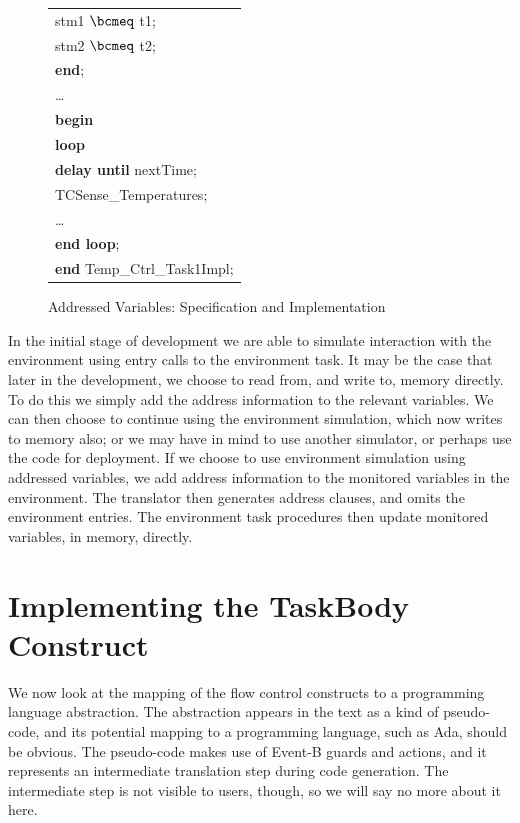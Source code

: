 \begin{figure}[b]
\begin{sffamily}
\begin{minipage}{0.5\linewidth}
\begin{center}
\begin{tabular}{l}
\qquad    stm1 $\bcmeq$ t1; \\
\qquad    stm2 $\bcmeq$ t2; \\
\quad  \textbf{end}; \\
\quad  \ldots \\
\textbf{begin} \\
\quad  \textbf{loop} \\
\quad\quad  \textbf{delay until} nextTime; \\
\quad\quad   TCSense\_Temperatures; \\
\quad\quad  \ldots \\
\quad  \textbf{end loop}; \\
\textbf{end} Temp\_Ctrl\_Task1Impl; 
\end{tabular}
\end{center}
\end{minipage}
\end{sffamily}
	\caption{Addressed Variables: Specification and Implementation}
	\label{fig:AddressedVars}
\end{figure}

In the initial stage of development we are able to simulate interaction with the environment using entry calls to the environment task. It may be the case that later in the development, we choose to read from, and write to, memory directly. To do this we simply add the address information to the relevant variables. We can then choose to continue using the environment simulation, which now writes to memory also; or we may have in mind to use another simulator, or perhaps use the code for deployment. If we choose to use environment simulation using addressed variables, we add address information to the monitored variables in the environment. The translator then generates address clauses, and omits the environment entries. The environment task procedures then update monitored variables, in memory, directly.
%
\section{Implementing the TaskBody Construct}\label{flowControl}
We now look at the mapping of the flow control constructs to a programming language abstraction. The abstraction appears in the text as a kind of pseudo-code, and its potential mapping to a programming language, such as Ada, should be obvious. The pseudo-code makes use of Event-B guards and actions, and it represents an intermediate translation step during code generation. The intermediate step is not visible to users, though, so we will say no more about it here. 

